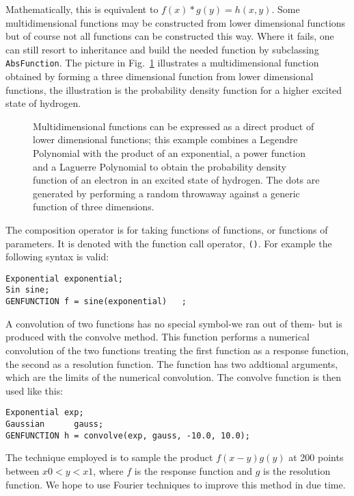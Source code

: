 \documentclass{report}
\begin{document}
\noindent Mathematically, this is equivalent to $f(x)*g(y) = h(x,y)$. Some
multidimensional functions may be constructed from lower dimensional
functions but of course not all functions can be constructed this way.
Where it fails, one can still resort to inheritance and build the
needed function by subclassing \verb#AbsFunction#. The picture in 
Fig.~\ref{ref:hydrogen} illustrates a multidimensional function obtained
by forming a three dimensional function from lower dimensional functions,
the illustration is the probability density function for a higher excited
state of hydrogen. 
\begin{figure}
\centerline{}
\caption{Multidimensional functions can be expressed as a direct product
of lower dimensional functions; this example combines a Legendre Polynomial
with the product of an exponential, a power function and a Laguerre Polynomial
to obtain the probability density function of an electron in an excited state
of hydrogen.  The dots are generated by performing a random throwaway against
a generic function of three dimensions.}
\label{ref:hydrogen}
\end{figure}
 


\noindent The composition operator is for taking functions of functions, or
functions of parameters. It is denoted with the function call
operator, \verb#()#.  For example the following syntax is valid:

\begin {verbatim}
Exponential exponential;
Sin sine;
GENFUNCTION f = sine(exponential)	;
\end{verbatim}

\noindent A convolution of two functions has no special symbol-we ran out of
them- but is produced with the convolve method.  This function
performs a numerical convolution of the two functions treating the
first function as a response function, the second as a resolution
function.  The function has two addtional arguments, which are the
limits of the numerical convolution.  The convolve function is then
used like this:

\begin{verbatim}
Exponential exp;
Gaussian      gauss;
GENFUNCTION h = convolve(exp, gauss, -10.0, 10.0);
\end{verbatim}

\noindent The technique employed is to sample the product $f(x-y) g(y)$ at 200
points between $x0 < y < x1$, where $f$ is the response function and
$g$ is the resolution function.  We hope to use Fourier techniques to
improve this method in due time.
\end{document}
